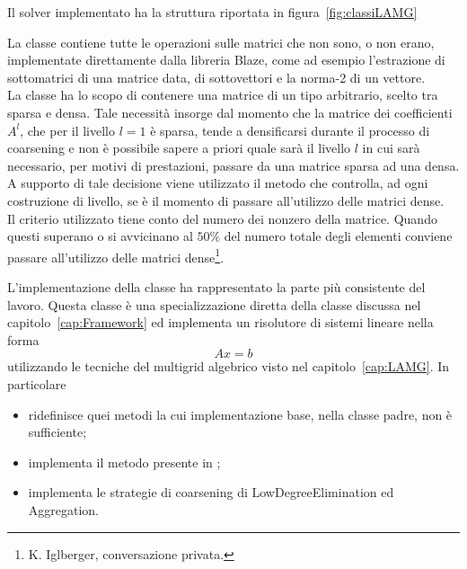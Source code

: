 
Il solver implementato ha la struttura riportata in figura~\vref{fig:classiLAMG}


La classe  contiene tutte le operazioni sulle matrici che non sono, o non erano, implementate direttamente dalla libreria Blaze, come ad esempio l'estrazione di sottomatrici di una matrice data, di sottovettori e la norma-2 di un vettore.
\\
La classe  ha lo scopo di contenere una matrice di un tipo arbitrario, scelto tra sparsa e densa. 
Tale necessità insorge dal momento che la matrice dei coefficienti $A^l$, che per il livello $l=1$ è sparsa, tende a densificarsi durante il processo di coarsening e non è possibile sapere a priori quale sarà il livello $l$ in cui sarà necessario, per motivi di prestazioni, passare da una matrice sparsa ad una densa.\\
A supporto di tale decisione viene utilizzato il metodo  che controlla, ad ogni costruzione di livello, se è il momento di passare all'utilizzo delle matrici dense.\\
Il criterio utilizzato tiene conto del numero dei nonzero della matrice. Quando questi superano o si avvicinano al $50\%$ del numero totale degli elementi conviene passare all'utilizzo delle matrici dense\footnote{K. Iglberger, conversazione privata.}.


L'implementazione della classe  ha rappresentato la parte più consistente del lavoro.
Questa classe è una specializzazione diretta della classe  discussa nel capitolo~\vref{cap:Framework} ed implementa un risolutore di sistemi lineare nella forma
\begin{equation*}
Ax = b
\end{equation*}
utilizzando le tecniche del multigrid algebrico visto nel capitolo~\vref{cap:LAMG}.
In particolare
\begin{itemize}
\item ridefinisce quei metodi la cui implementazione base, nella classe padre, non è sufficiente;
\item implementa il metodo  presente in ;
\item implementa le strategie di coarsening di LowDegreeElimination ed Aggregation.
\end{itemize}

